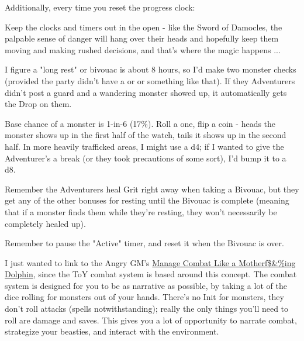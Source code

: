 {Additionally, every time you reset the progress clock:


Keep the clocks and timers out in the open - like the Sword of Damocles, the palpable sense of danger will hang over their heads and hopefully keep them moving and making rushed decisions, and that's where the magic happens ...


I figure a "long rest" or bivouac is about 8 hours, so I'd make two monster checks (provided the party didn't have a  or   or something like that).  If they Adventurers didn't post a guard and a wandering monster showed up, it automatically gets the Drop on them.

Base chance of a monster is 1-in-6 (17\%). Roll a one, flip a coin - heads the monster shows up in the first half of the watch, tails it shows up in the second half. In more heavily trafficked areas, I might use a d4; if I wanted to give the Adventurer's a break (or they took precautions of some sort), I'd bump it to a d8.  

Remember the Adventurers heal Grit right away when taking a Bivouac, but they  get any of the other bonuses for resting until the Bivouac is complete (meaning that if a monster finds them while they're resting, they won't necessarily be completely healed up).

Remember to pause the "Active" timer, and reset it when the Bivouac is over.





I just wanted to link to the Angry GM's \href{https://theangrygm.com/manage-combat-like-a-dolphin/}{Manage Combat Like a Motherf\$\&\%ing Dolphin}, since the ToY combat system is based around this concept. The combat system is designed for you to be as narrative as possible, by taking a lot of the dice rolling for monsters out of your hands. There's no Init for monsters, they don't roll attacks (spells notwithstanding); really the only things you'll need to roll are damage and saves.  This gives you a lot of opportunity to narrate combat, strategize your beasties, and interact with the environment. 


}
